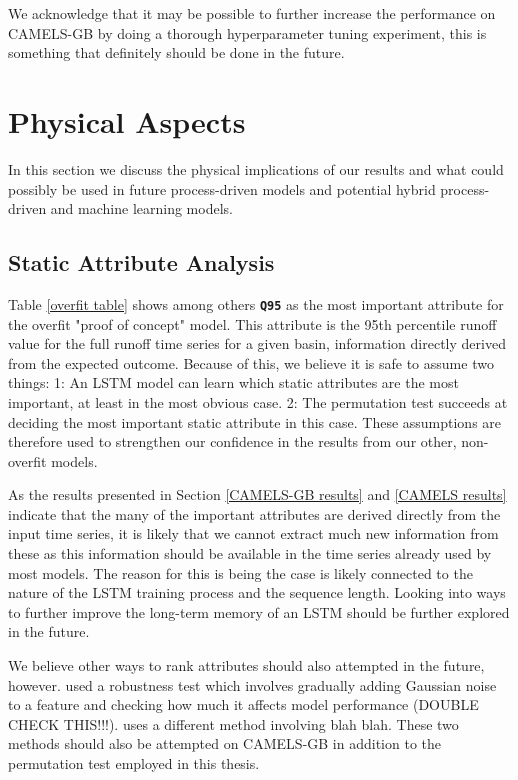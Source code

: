 We acknowledge that it may be possible to further increase the performance on 
CAMELS-GB by doing a thorough hyperparameter tuning experiment, this is 
something that definitely should be done in the future. 
\section{Physical Aspects}
In this section we discuss the physical implications of our results and what could 
possibly be used in future process-driven models and potential hybrid process-driven 
and machine learning models.
\subsection{Static Attribute Analysis}
\label{discuss static attributes}
Table \ref{overfit table} shows among others \textbf{\texttt{Q95}} as the most 
important attribute for the overfit "proof of concept" model. This attribute is the 
95th percentile runoff value for the full runoff time series for a given basin, 
information directly derived from the expected outcome. 
Because of this, we believe it is 
safe to assume two things: 1: An LSTM model can learn which static attributes are 
the most important, at least in the most obvious case. 2: The permutation test 
succeeds at deciding the most important static attribute in this case. These 
assumptions are therefore used to strengthen our confidence in the results from 
our other, non-overfit models. 

As the results presented in Section \ref{CAMELS-GB results} and \ref{CAMELS results} 
indicate that the many of the important attributes are derived directly from the 
input time series, it is likely that we cannot extract much new information from 
these as this information should be available in the time series already used by 
most models. The reason for this is being the case is likely connected to the 
nature of the LSTM training process and the sequence length. Looking into ways 
to further improve the long-term memory of an LSTM should be further explored 
in the future.

We believe other ways to rank attributes should also attempted 
in the future, however. \citet{lstm_second_paper} used a robustness test which 
involves gradually adding Gaussian noise to a feature and checking how much it 
affects model performance (DOUBLE CHECK THIS!!!). \citet{OrigCAMELSRanking} 
uses a different method involving blah blah. These two methods should also be 
attempted on CAMELS-GB in addition to the permutation test employed in this 
thesis.



